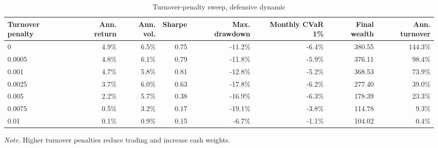 ﻿\begin{table}[H]
\centering
\caption{Turnover-penalty sweep, defensive dynamic}
\label{tab:allocation-turnover-penalty-defensive}
\small
\begin{adjustbox}{max width=\linewidth}
\begin{tabular}{lrrrrrrr}
\toprule
Turnover penalty & Ann. return & Ann. vol. & Sharpe & Max. drawdown & Monthly CVaR 1\% & Final wealth & Ann. turnover \\
\midrule
0 & 4.9\% & 6.5\% & 0.75 & -11.2\% & -6.4\% & 380.55 & 144.3\% \\
0.0005 & 4.8\% & 6.1\% & 0.79 & -11.8\% & -5.9\% & 376.11 & 98.4\% \\
0.001 & 4.7\% & 5.8\% & 0.81 & -12.8\% & -5.2\% & 368.53 & 73.9\% \\
0.0025 & 3.7\% & 6.0\% & 0.63 & -17.8\% & -6.2\% & 277.40 & 39.0\% \\
0.005 & 2.2\% & 5.7\% & 0.38 & -16.9\% & -6.3\% & 178.39 & 23.3\% \\
0.0075 & 0.5\% & 3.2\% & 0.17 & -19.1\% & -3.8\% & 114.78 & 9.3\% \\
0.01 & 0.1\% & 0.9\% & 0.15 & -6.7\% & -1.1\% & 104.02 & 0.4\% \\
\bottomrule
\end{tabular}
\end{adjustbox}
\vspace{0.25em}
\begin{minipage}{0.92\linewidth}\footnotesize
\emph{Note.} Higher turnover penalties reduce trading and increase cash weights.
\end{minipage}
\end{table}



